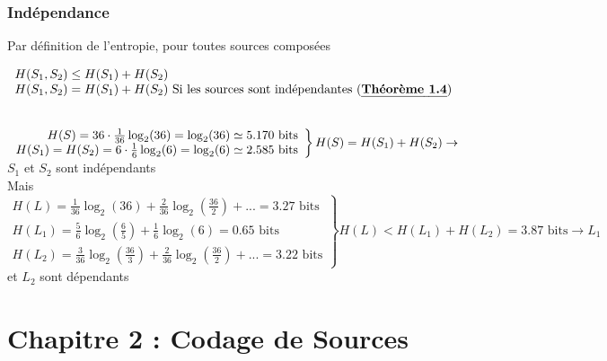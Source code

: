 \documentclass[11pt,a4paper]{article}
\renewcommand{\)}{\right)}
\renewcommand{\(}{\left(}
\begin{document}
\subsubsection{Indépendance}
Par définition de l'entropie, pour toutes sources composées
\begin{center}
$\begin{array}{ll}
	H(S_1,S_2) \leq H(S_1) + H(S_2)\\
	H(S_1,S_2) = H(S_1) + H(S_2)\text{ Si les sources sont indépendantes (\evid{Théorème 1.4})}
\end{array}$
\end{center}
\begin{exemple}~\\
	\label{H(L2)}
	$\left.\begin{array}{r}
		H(S) = 36\cdot \frac{1}{36} \log_2(36) = \log_2(36) \simeq 5.170 \text{ bits}\\
	H(S_1) = H(S_2) = 6\cdot \frac{1}{6} \log_2(6) = \log_2(6) \simeq 2.585 \text{ bits}
	\end{array}\right\}H(S) = H(S_1) + H(S_2) \\
	\to$ $S_1$ et $S_2$ sont indépendants\\
	Mais\\
	$\left.\begin{array}{r}
		H(L) = \frac{1}{36}\log_2(36) + \frac{2}{36}\log_2(\frac{36}{2}) + ... = 3.27\text{ bits}\\
		H(L_1) = \frac{5}{6}\log_2(\frac{6}{5}) + \frac{1}{6}\log_2(6) = 0.65 \text{ bits}\\
		H(L_2) = \frac{3}{36}\log_2(\frac{36}{3}) + \frac{2}{36}\log_2(\frac{36}{2}) + ... =3.22 \text{ bits}
	\end{array}	\right\} 	H(L) < H(L_1) + H(L_2) = 3.87 \text{ bits} 	 \to L_1$ et $L_2$ sont dépendants
\end{exemple}
\newpage

\section[Codage de Sources]{Chapitre 2 : Codage de Sources}
\end{document}
